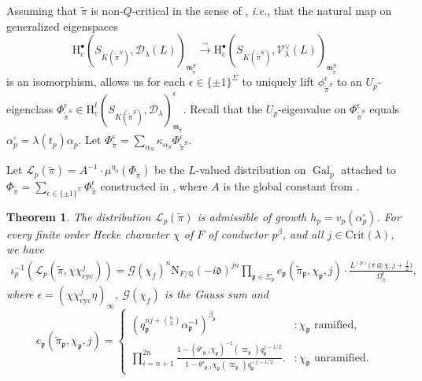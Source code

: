\documentclass{amsart}
\newtheorem{theorem}[thm]{Theorem}
\theoremstyle{definition}
\newcommand{\Q}{\mathbb{Q}}
\newcommand{\cL}{\mathcal{L}}
\newcommand{\fm}{\mathfrak{m}}
\newcommand{\fp}{\mathfrak{p}}
\newcommand{\Gal}{\operatorname{Gal}}
\newcommand{\cyc}{\operatorname{cyc}}
\begin{document}
{	
 Assuming  that $\widetilde\pi$ is non-$Q$-critical in the sense of \cite[Def.~3.14]{BDW}, {\it i.e.},  that the natural map on   generalized eigenspaces 
\[	\mathrm{H}_c^{\bullet}(S_{K(\widetilde\pi^S)}, \mathscr{D}_\lambda(L))_{\fm_{\widetilde\pi}^S}  
	\xrightarrow{\sim}  \mathrm{H}_c^{\bullet}(S_{K(\widetilde\pi^S)},\mathscr{V}_\lambda^\vee(L))_{\fm_{\widetilde\pi}^S}
\]
	is an isomorphism, allows us  for each $\epsilon \in \{\pm1\}^\Sigma$ to uniquely lift  $\phi_{\widetilde\pi^S}^\epsilon$  to an $U_p$-eigenclass 
	$\Phi_{\widetilde\pi^S}^\epsilon \in \mathrm{H}_c^t(S_{K(\widetilde\pi^S)},\mathscr{D}_\lambda)^\epsilon_{\fm_{\widetilde\pi}}$. 
	Recall that the $U_p$-eigenvalue  on $\Phi_{\widetilde\pi^S}^\epsilon$ equals $\alpha_p^{\circ} =  \lambda(t_p)\alpha_p$. Let $\Phi_{\widetilde\pi}^\epsilon = \sum\limits_{\alpha_S} \kappa_{\alpha_S} \Phi_{\widetilde\pi^S}^\epsilon$. 



	Let $\cL_p(\tilde\pi) = A^{-1}\cdot  \mu^{\eta_0}(\Phi_{\tilde\pi})$ be the $L$-valued distribution on $\Gal_p$ attached to  $\Phi_{\tilde\pi} = \sum\limits_{\epsilon \in \{\pm 1\}^\Sigma} \Phi_{\tilde\pi}^\epsilon$ constructed in \cite[Def.~6.17]{BDW}, where $A$ is the global constant from \cite[Def.~6.23]{BDW}. 
	
	
\begin{theorem} \label{thm:non-ordinary}
The distribution $\cL_p({\tilde{\pi}})$ is admissible of growth $h_p = v_p(\alpha_p^{\circ})$. For every finite order Hecke character $\chi$ of $F$ of conductor $p^{\beta}$, and all $j \in \mathrm{Crit}(\lambda)$, we have
	\begin{align}\label{eq:interpolation}
		\iota_p^{-1}(\cL_p(\tilde\pi, \chi\chi_{\cyc}^j)) =  \mathcal{G}(\chi_f)^n  \mathrm{N}_{F/\Q}(-i\mathfrak{d})^{jn}  \prod_{\fp\in \Sigma_p} e_{\fp}(\tilde\pi_{\fp},\chi_{\fp},j)
\cdot \frac{L^{(p)}\big(\pi\otimes\chi, j+\tfrac{1}{2}\big)}{\Omega_{\tilde\pi}^{\epsilon}},
	\end{align}
	where  $\epsilon = (\chi\chi_{\cyc}^j\eta)_\infty$,  $\mathcal{G}(\chi_f)$ is the Gauss sum and  
			\[
	e_{\fp}(\tilde\pi_{\fp},\chi_{\fp},j) = \left\{\begin{array}{cl}\left(q_{\fp}^{nj + \binom{n}{2}}\alpha_{\fp}^{-1}\right)^{\beta_{\fp}} &: \chi_{\fp} \text{ ramified},\\
			\prod\limits_{i=n+1}^{2n}
			\frac{1-(\theta'_{\fp,i}\chi_{\fp})^{-1}(\varpi_{\fp})q_{\fp}^{j-1/2}}{1-\theta'_{\fp,i}\chi_{\fp}(\varpi_{\fp})q_{\fp}^{-j-1/2}}. &: \chi_{\fp} \text{ unramified.}\end{array}\right.
		\]
\end{theorem}


}
\end{document}
